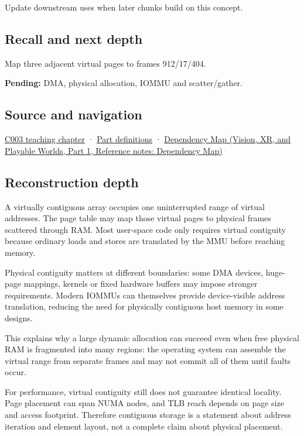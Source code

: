 Update downstream uses when later chunks build on this concept.

\subsection{Recall and next depth}\label{appendix-f897c1ddac8f-recall-and-next-depth}

\hypertarget{appendix-f897c1ddac8f-recall-and-next-depth}{}

Map three adjacent virtual pages to frames 912/17/404.

\textbf{Pending:} DMA, physical allocation, IOMMU and scatter/gather.

\subsection{Source and navigation}\label{appendix-f897c1ddac8f-source-and-navigation}

\hypertarget{appendix-f897c1ddac8f-source-and-navigation}{}

\hyperref[01-foundations-i-ch002-where-the-bytes-live]{C003 teaching chapter} · \hyperref[appendix-fd090d982a15-m003---parts-41-60]{Part definitions} · \href{../07-Vision-XR-and-Playable-Worlds-P01/main.pdf\#appendix-4ad47bdd269a}{Dependency Map (Vision, XR, and Playable Worlds, Part 1, Reference notes: Dependency Map)}

\subsection{Reconstruction depth}\label{appendix-f897c1ddac8f-reconstruction-depth}

\hypertarget{appendix-f897c1ddac8f-reconstruction-depth}{}

A virtually contiguous array occupies one uninterrupted range of virtual addresses. The page table may map those virtual pages to physical frames scattered through RAM. Most user-space code only requires virtual contiguity because ordinary loads and stores are translated by the MMU before reaching memory.

Physical contiguity matters at different boundaries: some DMA devices, huge-page mappings, kernels or fixed hardware buffers may impose stronger requirements. Modern IOMMUs can themselves provide device-visible address translation, reducing the need for physically contiguous host memory in some designs.

This explains why a large dynamic allocation can succeed even when free physical RAM is fragmented into many regions: the operating system can assemble the virtual range from separate frames and may not commit all of them until faults occur.

For performance, virtual contiguity still does not guarantee identical locality. Page placement can span NUMA nodes, and TLB reach depends on page size and access footprint. Therefore contiguous storage is a statement about address iteration and element layout, not a complete claim about physical placement.
